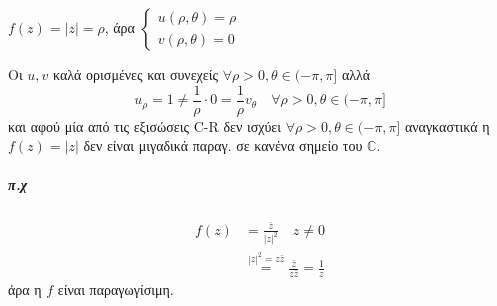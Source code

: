 \documentclass[12pt,a4paper,titlepage,fleqn]{article}
\begin{document}
	 \( f(z)=|z|=\rho \), άρα \( \begin{cases}
	 u(\rho,\theta)=\rho \\ v(\rho,\theta)=0
	 \end{cases} \)
	 
	 Οι \( u,v \) καλά ορισμένες και συνεχείς \( \forall \rho>0,
	 \theta\in (-\pi,\pi]
	  \) αλλά \[
	  u_\rho = 1 \neq \frac{1}{\rho}\cdot 0 =\frac{1}{\rho}v_\theta
	  \quad \forall \rho>0,\theta\in(-\pi,\pi]
	  \]
	  και αφού μία από τις εξισώσεις C-R δεν ισχύει \( \forall \rho>0,
	  \theta\in(-\pi,\pi]
	   \) αναγκαστικά η \( f(z)=|z| \) δεν είναι μιγαδικά παραγ. σε κανένα
	   σημείο του \( \mathbb C  \).
	\subparagraph{π.χ}
	\begin{align*}
	f(z) &= \frac{\bar z}{|z|^2} \quad z\neq0
	\\ &\overset{|z|^2=z\bar z}{=} \frac{\bar z}{z\bar z}=\frac{1}{z}
	\end{align*}
	άρα η \( f \) είναι παραγωγίσιμη.
	
\end{document}
